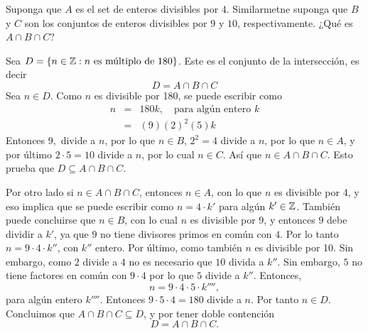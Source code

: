 Suponga que \( A \) es el set de enteros divisibles por \( 4 \). 
Similarmetne suponga que \( B \) y \( C \) son los conjuntos de enteros divisibles
por \( 9 \) y \( 10 \), respectivamente. ¿Qué es \( A \cap B \cap C \)?
\begin{solution}
    Sea \( D = \left\{  n \in \mathbb{Z}: n \text{ es múltiplo de }180  \right\} \). Este es el conjunto 
    de la intersección, es decir
    \[
        D = A \cap B \cap C
    \]
    Sea \( n \in D \). Como \( n \) es divisible por 180, se puede escribir como
    \begin{eqnarray*}
        n 
        &=&
        180 k,\quad\text{para algún entero }k\\
        &=&
        ( 9 ) ( 2 )^2 ( 5 ) k
    \end{eqnarray*}
    Entonces \( 9,\) divide a \( n \), por lo que \( n\in B \), 
    \( 2^2 = 4 \) divide a \( n \), por lo que \( n \in A \), y por último 
    \( 2 \cdot 5 = 10 \) divide a \( n \), por lo cual \( n \in C \).
    Así que \( n \in A\cap B \cap C \). 
    Esto prueba que \( D \subseteq A \cap B \cap C \).

    Por otro lado si \( n \in A \cap B \cap C \), entonces
    \( n \in A \), con lo que \( n \) es divisible por 4, y eso implica que 
    se puede escribir como \( n = 4 \cdot k' \) para algún \( k'\in \mathbb{Z} \).
    También puede concluirse que \( n \in B \), con lo cual \( n \) es divisible
    por \( 9 \), y entonces \( 9 \) debe dividir a 
    \( k' \), ya que \( 9 \) no tiene divisores primos en común con \( 4 \). Por lo tanto 
    \( n = 9 \cdot 4 \cdot k''\), con \( k'' \) entero. Por último, como también
    \( n \) es divisible por 10. Sin embargo, como \( 2 \) divide a \( 4 \) no 
    es necesario que \( 10 \) divida a \( k'' \). Sin embargo, \( 5 \) no tiene factores en común
    con \( 9 \cdot 4 \) por lo que \( 5 \) divide a \( k'' \). Entonces, 
    \[
        n = 9 \cdot 4 \cdot 5 \cdot k'''',
    \]
    para algún entero \( k'''' \). Entonces \( 9 \cdot 5 \cdot 4 = 180\) 
    divide a \( n \). Por tanto \( n\in D \). Concluimos que 
    \( A \cap B \cap C \subseteq D\), y por tener doble contención 
    \[
        D = A \cap B \cap C.
    \]
\end{solution}

